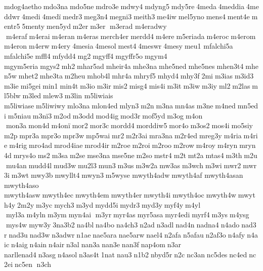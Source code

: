 mdog4aetho mdo3na mdo5ne mdro3e mdwy4 mdyng5 mdy5re 4meda 4meddia 4meddwr 4medi 4medï medr3 meg3n4 megni3 meith3 me4iw mel5yno mens4 ment4e mentr5 5menty men5yd m2er m3er  m3erad 	m4eradwy  m4eraf m4erai m4eran m4eras merch4er merdd4 m4ere m5eriada m4eroc m4erom m4eron m4erw m4ery 4mesia 4mesol mest4 4meswr 4mesy meu1 	mfalchi5a 	mfalchi5e mffl4 mfydd4 mg2 mgyff4 mgyffr5o mgym4 	mgym5eria mgys2 mh2 mhar5ad mheir4a mhe3na mhe5ned mhe5nes mhen3t4 mhen5w mhet2 mhe3ta m2heu mhob4l mhr4a mhryf5 mhyd4 mhy3f 2mi m3ias m3id3 m3ie mi5gei min1 min4t m3io m3ir mis2 misg4 mis4i m3it m3iw m3iy ml2 m2las ml5blw m3led mlew3 m3lin 	m5liwiais 	m5liwiase m5liwiwy mlo3na mlon4ed mlyn3 m2n m3na mn4as m3ne m4ned mn5edi m5niau m3nï3 m2od m3odd mod4ig mod3r mof5yd m3og m4on  mon3a mon4d m4onï mor2 mor3c mordd4 morddiw5 mor4o m3os2 mos4i mo5siy m2p mpr3a mpr3o mpr3w mp5wai mr2 m2r3ai mra3na m2r4ed mreg3y m4ria m4rie m4rig mro4ad mrod4iae mrod4ir m2roe m2roi m2roo m2row m4roy m4ryn mryn4d mrys4o ms2 m3sa m2se mse3na mse5ne m2so mstr4 m2t mt2a mtas4 m3th m2u mu4an mudd4l mud3w mu2l3 mun3 m3us m3w2a mw3as m3wch m3wi mwr2 mwr3i m3wt mwy3b mwyllt4 mwyn3 m5wyse 	mwyth4adw mwyth4af 
mwyth4asan 	mwyth4aso 	mwyth4asw mwyth4ec mwyth4em mwyth4er mwyth4i mwyth4oc mwyth4w mwyth4y 2m2y m3yc mych3 m3yd mydd5i mydr3 myd3y myf4y m4yl  myl3a m4yln m3ym myn4ai  m3yr myr4as myr5asa myr4edi myrf4 m3ys m4ysg  mys4w myw3y 3na3b2 na4bl na4bo na4ch3 n2ad n3adl nad4n nadna4 n4ado nad3r nad3u nad3w n3adwr n1ae nae5ara nae5arw nael4 n2afa n5afau n2af3o n4afy n4aic n4aig n4ain n4air n3al nan3a nan3e nan3f nap4om n3ar 
narllenad4 n3asg n4asol n3as4t 1nat nau3 n1b2 nbyd5r n2c nc3an nc5des nc4ed nc2ei nc5en  n3ch 
